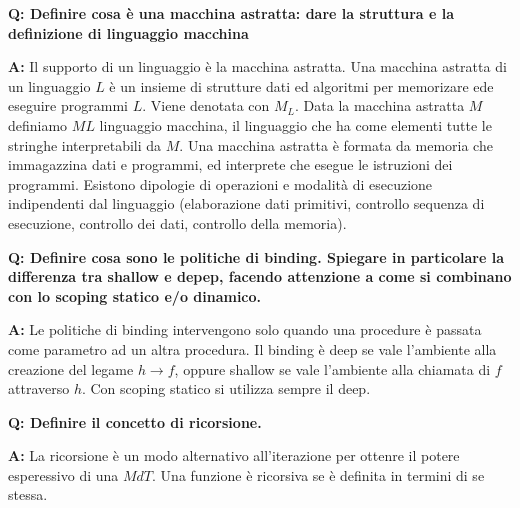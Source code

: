 \documentclass[a4paper]{article}
\newenvironment{qanda}{\setlength{\parindent}{0pt}}{\bigskip}
\newcommand{\Q}{\bigskip\bfseries Q: }
\newcommand{\A}{\par\textbf{A:} \normalfont}
\begin{document}
\begin{qanda}
	\Q Definire cosa è una macchina astratta: dare la struttura e la definizione di linguaggio macchina
	        
	\A Il supporto di un linguaggio è la macchina astratta. Una macchina astratta di un linguaggio $L$ è un insieme di strutture dati ed algoritmi per memorizare ede eseguire programmi $L$. Viene denotata con
	$M_L$. Data la macchina astratta $M$ definiamo $ML$ linguaggio macchina, il linguaggio che ha come elementi tutte le stringhe interpretabili da $M$.
	Una macchina astratta è formata da memoria che immagazzina dati e programmi, ed interprete che esegue le istruzioni dei programmi. Esistono dipologie di operazioni
	e modalità di esecuzione indipendenti dal linguaggio (elaborazione dati primitivi, controllo sequenza di esecuzione, controllo dei dati, controllo della memoria).
	\newline
    \newline
    
\end{qanda}
\begin{qanda}
	\Q Definire cosa sono le politiche di binding. Spiegare in particolare la differenza tra shallow e depep, facendo attenzione a come si combinano con lo scoping statico e/o dinamico.
	            
	\A Le politiche di binding intervengono solo quando una procedure è passata come parametro ad un altra procedura.
	Il binding è deep se vale l'ambiente alla creazione del legame $h \to f$, oppure shallow se vale l'ambiente alla chiamata di $f$ attraverso $h$. Con scoping statico si utilizza sempre il deep.
	\newline
    \newline
    
\end{qanda}
\begin{qanda}
	\Q Definire il concetto di ricorsione.
	                
	\A La ricorsione è un modo alternativo all'iterazione per ottenre il potere esperessivo di una $MdT$. Una funzione è ricorsiva se è definita in termini di se stessa.                  
\end{qanda}
    
\end{document}
